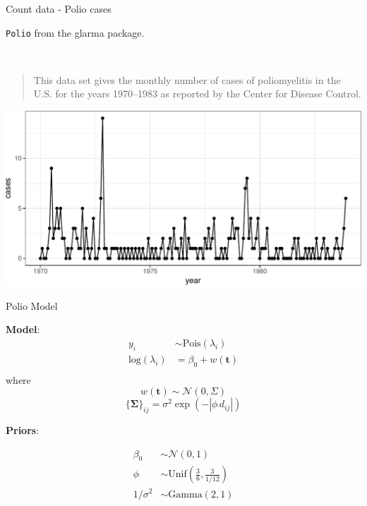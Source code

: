 \documentclass[11pt,ignorenonframetext,]{beamer}
\begin{document}
\begin{frame}[fragile]{Count data - Polio cases}
\protect\hypertarget{count-data---polio-cases}{}

\texttt{Polio} from the glarma package.

\(~\)

\begin{quote}
This data set gives the monthly number of cases of poliomyelitis in the
U.S. for the years 1970–1983 as reported by the Center for Disease
Control.
\end{quote}

\begin{center}\includegraphics[width=\textwidth]{Lec15_files/figure-beamer/unnamed-chunk-5-1} \end{center}

\end{frame}

\begin{frame}{Polio Model}
\protect\hypertarget{polio-model}{}

\textbf{Model}: \[\begin{aligned}
y_i &\sim \text{Pois}(\lambda_i) \\
\text{log}(\lambda_i) 
  &= \beta_0 + w(\symbf{t}) \\
\end{aligned}\] where \[ w(\symbf{t}) \sim \mathcal{N}(0,\Sigma) \]
\[\{\symbf{\Sigma}\}_{ij} = \sigma^2 \exp(-|\phi \, d_{ij}|)\]

\textbf{Priors}:

\[
\begin{aligned}
\beta_0 &\sim \mathcal{N}(0,1) \\
\phi &\sim \text{Unif}\left(\frac{3}{6}, \frac{3}{1/12}\right)\\
1/\sigma^2 &\sim \text{Gamma}(2,1)
\end{aligned}
\]

\end{frame}
\end{document}
